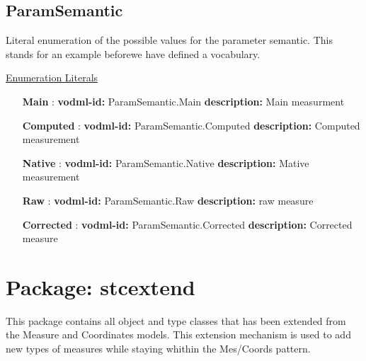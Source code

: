   \subsection{ParamSemantic}
  \label{sect:ParamSemantic}

  Literal enumeration of the possible values for the parameter semantic. This stands for an example beforewe have defined a vocabulary.

  \noindent \underline{Enumeration Literals}
  \vspace{-\parsep}
  \small
  \begin{itemize}
  
    \item[\textbf{Main}]: \textbf{vodml-id:} ParamSemantic.Main \newline
          \textbf{description:} Main measurment
    \item[\textbf{Computed}]: \textbf{vodml-id:} ParamSemantic.Computed \newline
          \textbf{description:} Computed measurement
    \item[\textbf{Native}]: \textbf{vodml-id:} ParamSemantic.Native \newline
          \textbf{description:} Mative measurement
    \item[\textbf{Raw}]: \textbf{vodml-id:} ParamSemantic.Raw \newline
          \textbf{description:} raw measure
    \item[\textbf{Corrected}]: \textbf{vodml-id:} ParamSemantic.Corrected \newline
          \textbf{description:} Corrected measure
  \end{itemize}
  \normalsize


\pagebreak
\section{Package: stcextend }


  This package contains all object and type classes that has been extended from the Measure and Coordinates models. This extension mechanism is used to add new types of measures while staying whithin the Mes/Coords pattern.

